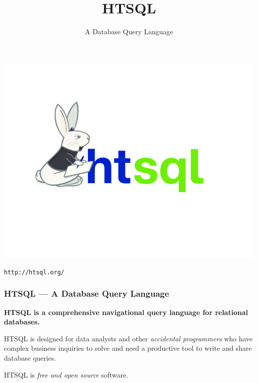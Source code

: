 \documentclass{beamer}
\title{HTSQL}
\subtitle{A Database Query Language}
\begin{document}
\begin{frame}[plain]
\includegraphics[width=\textwidth]{img/rabbit-htsql.png}
\begin{center}
\texttt{http://htsql.org/}
\end{center}
\end{frame}

\begin{frame}
\frametitle{HTSQL --- A Database Query Language}
\textbf{\Large HTSQL is a comprehensive navigational query language for relational
databases.}

\bigskip
HTSQL is designed for data analysts and other \emph{accidental programmers} who
have complex business inquiries to solve and need a productive tool to write
and share database queries.

\bigskip
HTSQL is \emph{free and open source} software.
\end{frame}
\end{document}
